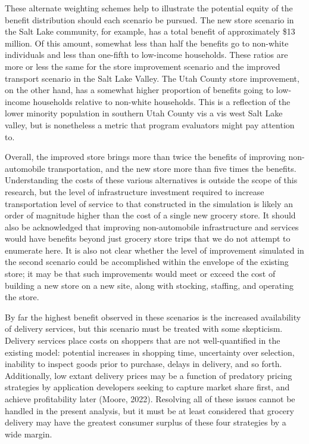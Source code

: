 \documentclass[
  letterpaper,
  number,
  review,
  doubleblind,
  3p]{elsarticle}
\begin{document}
These alternate weighting schemes help to illustrate the potential
equity of the benefit distribution should each scenario be pursued. The
new store scenario in the Salt Lake community, for example, has a total
benefit of approximately \$13 million. Of this amount, somewhat less
than half the benefits go to non-white individuals and less than
one-fifth to low-income households. These ratios are more or less the
same for the store improvement scenario and the improved transport
scenario in the Salt Lake Valley. The Utah County store improvement, on
the other hand, has a somewhat higher proportion of benefits going to
low-income households relative to non-white households. This is a
reflection of the lower minority population in southern Utah County vis
a vis west Salt Lake valley, but is nonetheless a metric that program
evaluators might pay attention to.

Overall, the improved store brings more than twice the benefits of
improving non-automobile transportation, and the new store more than
five times the benefits. Understanding the costs of these various
alternatives is outside the scope of this research, but the level of
infrastructure investment required to increase transportation level of
service to that constructed in the simulation is likely an order of
magnitude higher than the cost of a single new grocery store. It should
also be acknowledged that improving non-automobile infrastructure and
services would have benefits beyond just grocery store trips that we do
not attempt to enumerate here. It is also not clear whether the level of
improvement simulated in the second scenario could be accomplished
within the envelope of the existing store; it may be that such
improvements would meet or exceed the cost of building a new store on a
new site, along with stocking, staffing, and operating the store.

By far the highest benefit observed in these scenarios is the increased
availability of delivery services, but this scenario must be treated
with some skepticism. Delivery services place costs on shoppers that are
not well-quantified in the existing model: potential increases in
shopping time, uncertainty over selection, inability to inspect goods
prior to purchase, delays in delivery, and so forth. Additionally, low
extant delivery prices may be a function of predatory pricing strategies
by application developers seeking to capture market share first, and
achieve profitability later (Moore, 2022). Resolving all of these issues
cannot be handled in the present analysis, but it must be at least
considered that grocery delivery may have the greatest consumer surplus
of these four strategies by a wide margin.
\end{document}
